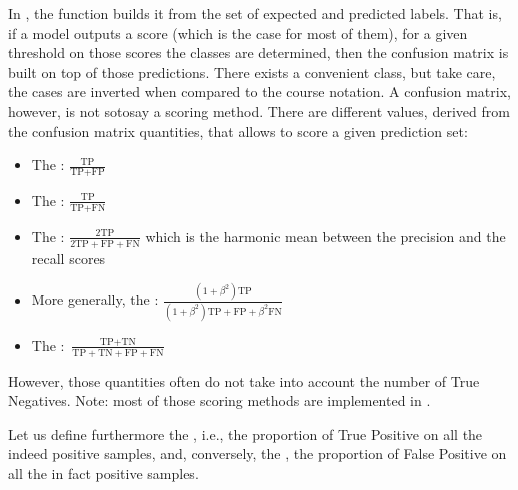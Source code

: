 \documentclass[letterpaper,10pt,english]{jupyterBook}
\begin{document}
\sphinxAtStartPar
In , the function  builds it from the set of expected and predicted labels. That is, if a model outputs a score (which is the case for most of them), for a given threshold on those scores the classes are determined, then the confusion matrix is built on top of those predictions. There exists a convenient  class, but take care, the cases are inverted when compared to the course notation. A confusion matrix, however, is not so\sphinxhyphen{}to\sphinxhyphen{}say a scoring method. There are different values, derived from the confusion matrix quantities, that allows to score a given prediction set:
\begin{itemize}
\item {} 
\sphinxAtStartPar
The : \(\frac{\text{TP}}{\text{TP}+\text{FP}}\)

\item {} 
\sphinxAtStartPar
The : \(\frac{\text{TP}}{\text{TP}+\text{FN}}\)

\item {} 
\sphinxAtStartPar
The : \(\frac{2\text{TP}}{2\text{TP}+\text{FP}+\text{FN}}\) which is the harmonic mean between the precision and the recall scores

\item {} 
\sphinxAtStartPar
More generally, the :  \(\frac{(1+\beta^2)\text{TP}}{(1+\beta^2)\text{TP}+\text{FP}+\beta^2\text{FN}}\)

\item {} 
\sphinxAtStartPar
The : \(\frac{\text{TP}+\text{TN}}{\text{TP}+\text{TN}+\text{FP}+\text{FN}}\)

\end{itemize}

\sphinxAtStartPar
However, those quantities often do not take into account the number of True Negatives. Note: most of those scoring methods are implemented in .

\sphinxAtStartPar
Let us define furthermore the , i.e., the proportion of True Positive on all the indeed positive samples, and, conversely, the  , the proportion of False Positive on all the in fact positive samples.
\end{document}
